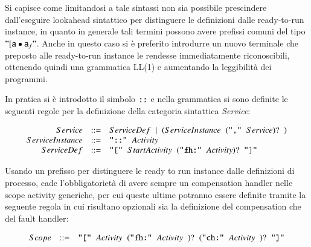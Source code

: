 Si capisce come limitandosi a tale sintassi non sia possibile prescindere
dall'eseguire lookahead sintattico per distinguere le definizioni dalle
ready-to-run instance, in quanto in generale tali termini possono avere prefissi comuni del tipo $"[{\sf a} \bullet {\sf a}_f"$. Anche in questo caso si è preferito
introdurre un nuovo terminale che preposto alle ready-to-run instance le
rendesse immediatamente riconoscibili, ottenendo quindi una grammatica LL(1)
e aumentando la leggibilità dei programmi.

In pratica si è introdotto il simbolo $\verb#::#$ e nella grammatica si sono
definite le seguenti regole per la definizione della categoria sintattica
\emph{Service}:

$$
\begin{array}{rcl}
Service & ::= &  ServiceDef \hspace{0.2cm} | \hspace{0.2cm} ( ServiceInstance
\hspace{0.2cm}( \verb#","# \hspace{0.2cm} Service  )? \hspace{0.2cm} )  \\ 

ServiceInstance & ::= &  \verb#"::"# \hspace{0.2cm} Activity \\
 
ServiceDef & ::= & \verb#"["# \hspace{0.2cm} StartActivity \hspace{0.2cm} (
\verb#"fh:"# \hspace{0.2cm} Activity )? \hspace{0.2cm} \verb#"]"# \\

\end{array}
$$

Usando un prefisso per distinguere le ready to run instance dalle
definizioni di processo, cade l'obbligatorietà di avere sempre un compensation
handler nelle scope activity generiche, per cui queste ultime potranno essere
definite tramite la seguente regola in cui risultano opzionali sia la
definizione del compensation che del fault handler:

$$
\begin{array}{rcl}
Scope & ::= & \verb#"["# \hspace{0.2cm} Activity \hspace{0.2cm} (
\verb#"fh:"# \hspace{0.2cm} Activity \hspace{0.2cm})? \hspace{0.2cm}(
\verb#"ch:"# \hspace{0.2cm}Activity \hspace{0.2cm})?\hspace{0.2cm} \verb#"]"#
\end{array}
$$

